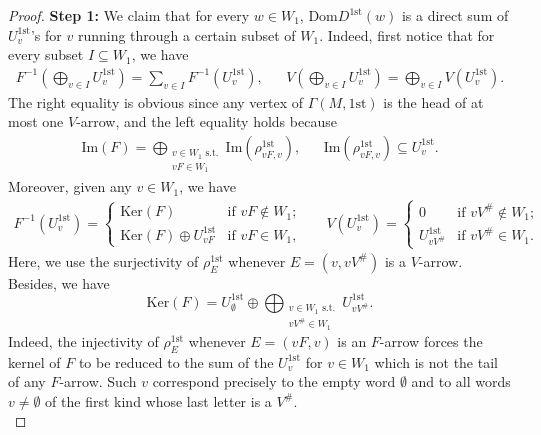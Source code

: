 \documentclass[10pt,a4paper]{amsart}
\begin{document}
\begin{proof}
    \textbf{Step 1:} We claim that for every $w\in W_1$, $\mathrm{Dom}D^{1\mathrm{st}}(w)$ is a direct sum of $U^{1\mathrm{st}}_v$'s for $v$ running through a certain subset of $W_1$. Indeed, first notice that for every subset $I \subseteq  W_1$, we have 
    \begin{align*}
        F^{-1}\left(\bigoplus_{v \in I} U^{1\mathrm{st}}_v\right) = \sum_{v \in I} F^{-1}(U^{1\mathrm{st}}_v), & & V\left(\bigoplus_{v \in I} U^{1\mathrm{st}}_v\right) = \bigoplus_{v \in I} V(U^{1\mathrm{st}}_v).
    \end{align*}
    The right equality is obvious since any vertex of $\Gamma(M,1\mathrm{st})$ is the head of at most one $V$-arrow, and the left equality holds because 
    \begin{align*}
    \mathrm{Im}(F) = \bigoplus_{\substack{v \in W_1 \text{ s.t.}\\ vF \in W_1}} \mathrm{Im}(\rho_{vF,v}^{1\mathrm{st}}), & & \mathrm{Im}(\rho_{vF,v}^{1\mathrm{st}}) \subseteq  U^{1\mathrm{st}}_v.
    \end{align*}
    Moreover, given any $v \in W_1$, we have 
    \begin{align*}
        F^{-1}(U^{1\mathrm{st}}_v) = \begin{cases}
            \mathrm{Ker}(F) & \text{if } vF \not \in W_1;\\
            \mathrm{Ker}(F) \oplus U^{1\mathrm{st}}_{vF} & \text{if } vF \in W_1,
        \end{cases}
        & &
        V(U^{1\mathrm{st}}_v) = \begin{cases}
            0 & \text{if } vV^{\#} \not \in W_1;\\
            U^{1\mathrm{st}}_{vV^{\#}} & \text{if } vV^{\#} \in W_1.
        \end{cases}
    \end{align*}
    Here, we use the surjectivity of $\rho^{1\mathrm{st}}_E$ whenever $E = (v,vV^{\#})$ is a $V$-arrow. Besides, we have 
    \begin{equation*}
        \mathrm{Ker}(F) = U^{1\mathrm{st}}_{\emptyset} \oplus \bigoplus_{\substack{v \in W_1 \text{ s.t.} \\ vV^{\#} \in W_1}} U^{1\mathrm{st}}_{vV^{\#}}.
    \end{equation*}
    Indeed, the injectivity of $\rho^{1\mathrm{st}}_E$ whenever $E = (vF,v)$ is an $F$-arrow forces the kernel of $F$ to be reduced to the sum of the $U^{1\mathrm{st}}_v$ for $v \in W_1$ which is not the tail of any $F$-arrow. Such $v$ correspond precisely to the empty word $\emptyset$ and to all words $v \not = \emptyset$ of the first kind whose last letter is a $V^{\#}$.\\

\end{proof}
\end{document}
